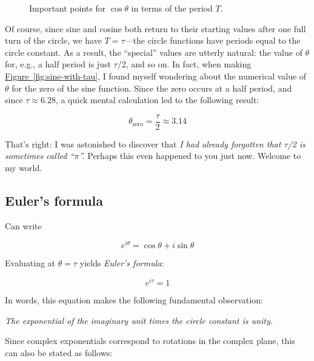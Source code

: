 \documentclass{article}
\begin{document}
\begin{figure}
\begin{center}
\end{center}
\caption{Important points for $\cos\theta$ in terms of the period $T$.\label{fig:cosine-with-tau}}
\end{figure}

Of course, since sine and cosine both return to their starting values after one full turn of the circle, we have $T = \tau$---the circle functions have periods equal to the circle constant. As a result, the ``special'' values are utterly natural: the value of $\theta$ for, e.g., a half period is just $\tau$/2, and so on. In fact, when making \hyperref[fig:sine-with-tau]{Figure~}\ref{fig:sine-with-tau}, I found myself wondering about the numerical value of $\theta$ for the zero of the sine function. Since the zero occurs at a half period, and since $\tau \approx 6.28$, a quick mental calculation led to the following result:

\[
  \theta_\mathrm{zero} = \frac{\tau}{2} \approx 3.14
\]

\noindent That's right: I was astonished to discover that \emph{I had already forgotten that $\tau$/2 is sometimes called ``$\pi$''.} Perhaps this even happened to you just now. Welcome to my world.



   \subsection{Euler's formula} %
   \label{sec:euler_s_formula}
   

Can write

\[ e^{i\theta} = \cos\theta + i\sin\theta \]

Evaluating at $\theta = \tau$ yields \emph{Euler's formula}:

\[ e^{i\tau} = 1 \]


In words, this equation makes the following fundamental observation: 

\begin{center}
\emph{The exponential of the imaginary unit times the circle constant is unity.} 
\end{center}

Since complex exponentials correspond to rotations in the complex plane, this can also be stated as follows:
\end{document}
